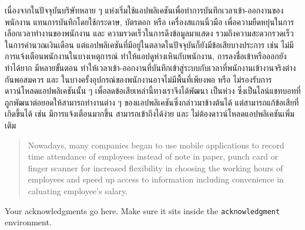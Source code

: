 \maketitle
\makesignature

\ifproject
\begin{abstractTH}

เนื่องจากในปัจจุบันบริษัทหลาย ๆ แห่งเริ่มใช้แอปพลิเคชันเพื่อทำการบันทึกเวลาเข้า-ออกงานของพนักงาน แทนการบันทึกโดยใช้กระดาษ, บัตรตอก หรือ เครื่องสแกนนิ้วมือ
\enskip เพื่อความยืดหยุ่นในการเลือกเวลาทำงานของพนักงาน และ ความรวดเร็วในการดึงข้อมูลมาแสดง รวมถึงความสะดวกรวดเร็วในการคำนวณเงินเดือน
\enskip แต่แอปพลิเคชันที่มีอยู่ในตลาดในปัจจุบันก็ยังมีข้อเสียบางประการ เช่น ไม่มีการแจ้งเตือนพนักงานในบางเหตุการณ์ ทำให้แอปดูห่างเหินกับพนักงาน, 
การลงชื่อเข้าหรือออกยังทำได้ยาก มีหลายขั้นตอน ทำให้เวลาเข้า-ออกงานที่บันทึกเข้าสู่ระบบกับเวลาที่พนักงานเข้างานจริงต่างกันพอสมควร 
และ ในบางครั้งอุปกรณ์ของพนักงานอาจไม่มีพื้นที่เพียงพอ หรือ ไม่รองรับการดาวน์โหลดแอปพลิเคชันนั้น ๆ
\enskip เพื่อลดข้อเสียเหล่านี้ทางเราจึงได้พัฒนา เป็นห่วง ซึ่งเป็นไลน์แชทบอทที่ถูกพัฒนาต่อยอดให้สามารถทำงานต่าง ๆ ของแอปพลิเคชันซึ่งกล่าวมาข้างต้นได้
แต่สามารถแก้ข้อเสียที่เกิดขึ้นได้ เช่น มีการแจ้งเตือนมากขึ้น สามารถเข้าถึงได้ง่าย และ ไม่ต้องดาวน์โหลดแอปพลิเคชันเพิ่มเติม
\end{abstractTH}


\begin{abstract}
Nowadays, many companies began to use mobile applications to record time attendance of employees instead of note in paper, punch card or finger scanner 
for increased flexibility in choosing the working hours of employees and speed up access to information including convenience in caluating employee's salary.

\end{abstract}

\iffalse
\begin{dedication}
This document is dedicated to all Chiang Mai University students.

Dedication page is optional.
\end{dedication}
\fi %

\begin{acknowledgments}
Your acknowledgments go here. Make sure it sits inside the
\texttt{acknowledgment} environment.

\end{acknowledgments}%
\fi %

\contentspage

\ifproject
\figurelistpage

\tablelistpage
\fi %



